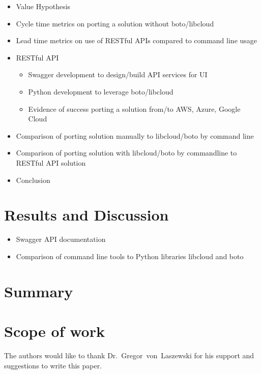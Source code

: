\begin{itemize}
\item
  Value Hypothesis
\item
  Cycle time metrics on porting a solution without boto/libcloud
\item
  Lead time metrics on use of RESTful APIs compared to command line
  usage
\item
  RESTful API

  \begin{itemize}
    \item
    Swagger development to design/build API services for UI
  \item
    Python development to leverage boto/libcloud
  \item
    Evidence of success porting a solution from/to AWS, Azure, Google
    Cloud
  \end{itemize}
\item
  Comparison of porting solution manually to libcloud/boto by command
  line
\item
  Comparison of porting solution with libcloud/boto by commandline to
  RESTful API solution
\item
  Conclusion
\end{itemize}

\section{Results and Discussion}

\begin{itemize}
\item
  Swagger API documentation
\item
  Comparison of command line tools to Python libraries libcloud and boto
\end{itemize}

\section{Summary}

\section{Scope of work}\label{scope-of-work}

\begin{acks}

  The authors would like to thank Dr.~Gregor~von~Laszewski for his
  support and suggestions to write this paper.

\end{acks}


 

